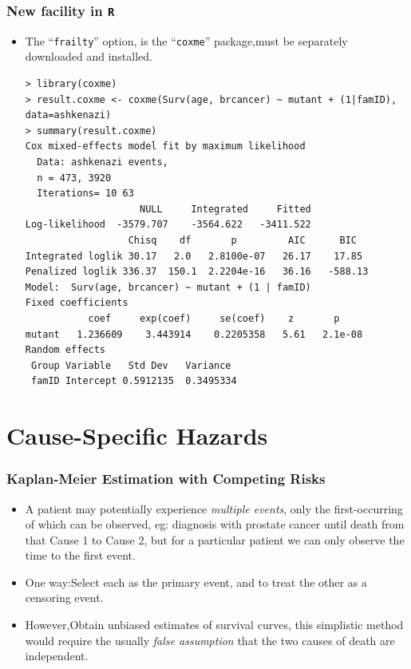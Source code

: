 \documentclass{beamer}
\newcommand{\empr}[1]{{\emph{\color{red}#1}}}
\begin{document}
\pagebreak
\begin{frame}[fragile]
\frametitle{New facility in \texttt{R}}
\begin{itemize}
\item The ``\texttt{frailty}'' option, is the ``\texttt{coxme}'' package,must be separately downloaded and installed.
\begin{Verbatim}
> library(coxme)
> result.coxme <- coxme(Surv(age, brcancer) ~ mutant + (1|famID), 
data=ashkenazi)
> summary(result.coxme)    
Cox mixed-effects model fit by maximum likelihood
  Data: ashkenazi events, 
  n = 473, 3920
  Iterations= 10 63           
                    NULL     Integrated     Fitted
Log-likelihood  -3579.707    -3564.622   -3411.522    
                  Chisq    df       p         AIC      BIC
Integrated loglik 30.17   2.0   2.8100e-07   26.17    17.85 
Penalized loglik 336.37  150.1  2.2204e-16   36.16   -588.13
Model:  Surv(age, brcancer) ~ mutant + (1 | famID)
Fixed coefficients
           coef     exp(coef)     se(coef)    z       p 
mutant   1.236609    3.443914    0.2205358   5.61   2.1e-08
Random effects
 Group Variable   Std Dev   Variance 
 famID Intercept 0.5912135  0.3495334      
\end{Verbatim}
\end{itemize}
\end{frame}

\section{Cause-Specific Hazards}
\begin{frame}[fragile]
\frametitle{Kaplan-Meier Estimation with Competing Risks}
\begin{itemize}
\item A patient may potentially experience \empr{multiple events}, only the first-occurring of which can be observed, eg: diagnosis with prostate cancer until death from that Cause 1 to Cause 2, but for a particular patient we can only observe the time to the first event.
\item One way:Select each as the primary event, and to treat the other as a censoring event.
\item However,Obtain unbiased estimates of survival curves, this simplistic method would require the usually \empr{false assumption} that the two causes of death are independent.
\end{itemize}
\end{frame}
\end{document}
